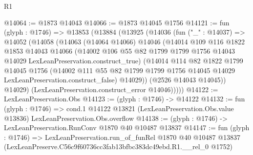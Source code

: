 \begin{lexlean}{R1}
\begin{coremodule}
@14064 := @1873 @14043
@14066 := @1873 @14045 @1756
@14121 := fun (glyph : @1746) =>
  @13853
    (@13884
      (@13925
        (@14036
          (fun ("_" : @14037) =>
          @14052
            (@14058
              (@14063
                (@14064 @14066)
                @14046
                (@14014
                  @109
                  @116
                  @1822
                  @1853
                  @14043
                  @14066
                  (@14002
                    @106
                    @55
                    @82
                    @1799
                    @1799
                    @1756
                    @14043
                    @14029
                    LexLeanPreservation.construct_true)
                  (@14014
                    @114
                    @82
                    @1822
                    @1799
                    @14045
                    @1756
                    (@14002
                      @111
                      @55
                      @82
                      @1799
                      @1799
                      @1756
                      @14045
                      @14029
                      LexLeanPreservation.construct_false)
                    @14029))
                (@2526 @14043 @14045))
              @14029)
            (LexLeanPreservation.construct_error @14046)))))
@14122 := LexLeanPreservation.Obs
@14123 := (glyph : @1746) -> @14122
@14132 := fun (glyph : @1746) =>
  cond.{1} @14122 @13821 (LexLeanPreservation.Obs.value @13836) LexLeanPreservation.Obs.overflow
@14138 := (glyph : @1746) -> LexLeanPreservation.RunConv @1870 @40 @10487 @13837
@14147 := fun (glyph : @1746) =>
  LexLeanPreservation.run_of_funRel
    @1870
    @40
    @10487
    @13837
    (LexLeanPreserve.C56c9f60736cc3fab13bfbc383dc49ebd.R1.__rel_0 @1752)
\end{coremodule}
\end{lexlean}
